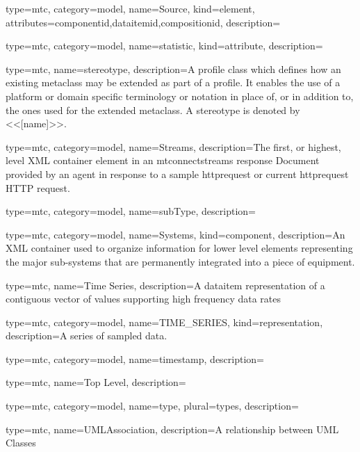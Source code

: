 {
  type=mtc,
  category=model,
  name={Source},
  kind={element},
  attributes={\gls{componentid},\gls{dataitemid},\gls{compositionid}},
  description={}
}


{
  type=mtc,
  category=model,
  name={statistic},
  kind={attribute},
  description={}
}


{
  type=mtc,
  name=stereotype,
  description={A profile class which defines how an existing metaclass may be extended as part of a profile. It enables the use of a platform or domain specific terminology or notation in place of, or in addition to, the ones used for the extended metaclass. A stereotype is denoted by <<[name]>>.}
}


{
  type=mtc,
  category=model,
  name={Streams},
  description={The first, or highest, level XML container element in an \glspl{mtconnectstream} \gls{response} Document provided by an \gls{agent} in response to a \gls{sample httprequest} or \gls{current httprequest} HTTP \gls{request}.}
}


{
  type=mtc,
  category=model,
  name={subType},
  description={}
}


{
  type=mtc,
  category=model,
  name={Systems},
  kind={component},
  description={An XML container used to organize information for \gls{lower level} elements representing the major sub-systems that are permanently integrated into a piece of equipment.}
}


{
  type=mtc,
  name={Time Series},
  description={A \gls{dataitem} representation of a contiguous vector of values supporting high frequency data rates}
}


{
  type=mtc,
  category=model,
  name={TIME\_SERIES},
  kind={representation},
  description={A series of sampled data. }
}


{
  type=mtc,
  category=model,
  name={timestamp},
  description={}
}


{
  type=mtc,
  name={Top Level},
  description={}
}


{
  type=mtc,
  category=model,
  name={type},
  plural={types},
  description={}
}


{
  type=mtc,
  name=UMLAssociation,
  description={A relationship between UML Classes}
}


